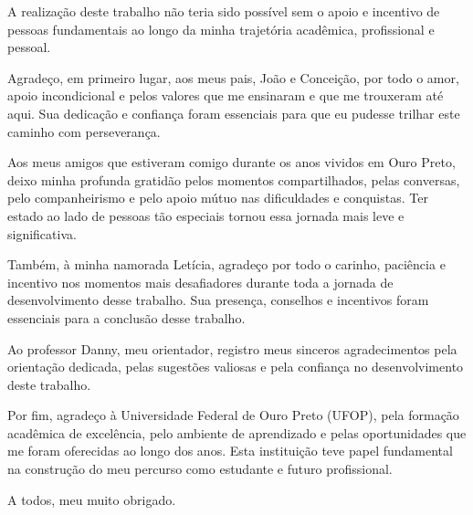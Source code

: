 \documentclass[
	12pt,				%
	openright,			%
	oneside,			%
	a4paper,			%
	english,			%
	brazil				%
	]{abntex2}
\theoremstyle{doispontos}
\begin{document}
\imprimirfolhaderosto

%     


%


\begin{agradecimentos}
\noindent A realização deste trabalho não teria sido possível sem o apoio e incentivo de pessoas fundamentais ao longo da minha trajetória acadêmica, profissional e pessoal.

\noindent Agradeço, em primeiro lugar, aos meus pais, João e Conceição, por todo o amor, apoio incondicional e pelos valores que me ensinaram e que me trouxeram até aqui. Sua dedicação e confiança foram essenciais para que eu pudesse trilhar este caminho com perseverança.

\noindent Aos meus amigos que estiveram comigo durante os anos vividos em Ouro Preto, deixo minha profunda gratidão pelos momentos compartilhados, pelas conversas, pelo companheirismo e pelo apoio mútuo nas dificuldades e conquistas. Ter estado ao lado de pessoas tão especiais tornou essa jornada mais leve e significativa. 

\noindent Também, à minha namorada Letícia, agradeço por todo o carinho, paciência e incentivo nos momentos mais desafiadores durante toda a jornada de desenvolvimento desse trabalho. Sua presença, conselhos e incentivos foram essenciais para a conclusão desse trabalho.

\noindent Ao professor Danny, meu orientador, registro meus sinceros agradecimentos pela orientação dedicada, pelas sugestões valiosas e pela confiança no desenvolvimento deste trabalho. 

\noindent Por fim, agradeço à Universidade Federal de Ouro Preto (UFOP), pela formação acadêmica de excelência, pelo ambiente de aprendizado e pelas oportunidades que me foram oferecidas ao longo dos anos. Esta instituição teve papel fundamental na construção do meu percurso como estudante e futuro profissional.

\noindent A todos, meu muito obrigado.

\end{agradecimentos}
\end{document}
